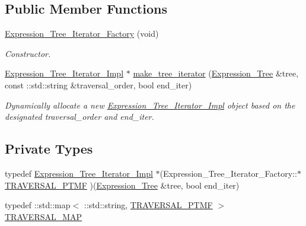 \subsection*{Public Member Functions}
\begin{DoxyCompactItemize}
\item 
\hyperlink{classMadara_1_1Expression__Tree_1_1Expression__Tree__Iterator__Factory_ae7a0e262d355c6c715359759ae020cce}{Expression\_\-Tree\_\-Iterator\_\-Factory} (void)
\begin{DoxyCompactList}\small\item\em Constructor. \item\end{DoxyCompactList}\item 
\hyperlink{classMadara_1_1Expression__Tree_1_1Expression__Tree__Iterator__Impl}{Expression\_\-Tree\_\-Iterator\_\-Impl} $\ast$ \hyperlink{classMadara_1_1Expression__Tree_1_1Expression__Tree__Iterator__Factory_a4fabd7762791d76f45b796a6a5cdac1e}{make\_\-tree\_\-iterator} (\hyperlink{classMadara_1_1Expression__Tree_1_1Expression__Tree}{Expression\_\-Tree} \&tree, const ::std::string \&traversal\_\-order, bool end\_\-iter)
\begin{DoxyCompactList}\small\item\em Dynamically allocate a new {\itshape \hyperlink{classMadara_1_1Expression__Tree_1_1Expression__Tree__Iterator__Impl}{Expression\_\-Tree\_\-Iterator\_\-Impl}\/} object based on the designated {\itshape traversal\_\-order\/} and {\itshape end\_\-iter\/}. \item\end{DoxyCompactList}\end{DoxyCompactItemize}
\subsection*{Private Types}
\begin{DoxyCompactItemize}
\item 
typedef \hyperlink{classMadara_1_1Expression__Tree_1_1Expression__Tree__Iterator__Impl}{Expression\_\-Tree\_\-Iterator\_\-Impl} $\ast$(Expression\_\-Tree\_\-Iterator\_\-Factory::$\ast$ \hyperlink{classMadara_1_1Expression__Tree_1_1Expression__Tree__Iterator__Factory_a40f71753b0013655c8f227129f618ae9}{TRAVERSAL\_\-PTMF} )(\hyperlink{classMadara_1_1Expression__Tree_1_1Expression__Tree}{Expression\_\-Tree} \&tree, bool end\_\-iter)
\item 
typedef ::std::map$<$ ::std::string, \hyperlink{classMadara_1_1Expression__Tree_1_1Expression__Tree__Iterator__Factory_a40f71753b0013655c8f227129f618ae9}{TRAVERSAL\_\-PTMF} $>$ \hyperlink{classMadara_1_1Expression__Tree_1_1Expression__Tree__Iterator__Factory_aa032e0fc34454740fe22d550406e6f2b}{TRAVERSAL\_\-MAP}
\end{DoxyCompactItemize}
